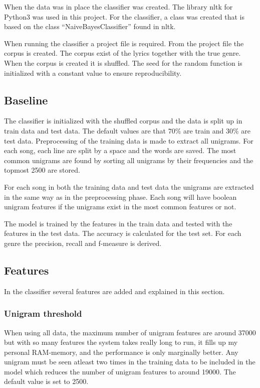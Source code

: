 \documentclass[a4paper, 12pt]{article}
\begin{document}
When the data was in place the classifier was created.
The library nltk for Python3 was used in this project. \cite{nltk}
For the classifier, a class was created that is based on the class ``NaiveBayesClassifier'' found in nltk.

When running the classifier a project file is required.
From the project file the corpus is created.
The corpus exist of the lyrics together with the true genre.
When the corpus is created it is shuffled.
The seed for the random function is initialized with a constant value to ensure reproducibility.

\subsection{Baseline}
\label{sec:baseline}
The classifier is initialized with the shuffled corpus and the data is split up in train data and test data.
The default values are that $70\%$ are train and $30\%$ are test data.
Preprocessing of the training data is made to extract all unigrams.
For each song, each line are split by a space and the words are saved.
The most common unigrams are found by sorting all unigrams by their frequencies and the topmost 2500 are stored.

For each song in both the training data and test data the unigrams are extracted in the same way as in the preprocessing phase.
Each song will have boolean unigram features if the unigrams exist in the most common features or not.

The model is trained by the features in the train data and tested with the features in the test data.
The accuracy is calculated for the test set.
For each genre the precision, recall and f-measure is derived.

\subsection{Features}
\label{sec:feat}
In the classifier several features are added and explained in this section.

\subsubsection*{Unigram threshold}
When using all data, the maximum number of unigram features are around 37000 but with so many features the system takes really long to run, it fills up my personal RAM-memory, and the performance is only marginally better.
Any unigram must be seen atleast two times in the training data to be included in the model which reduces the number of unigram features to around 19000.
The default value is set to 2500.
\end{document}
